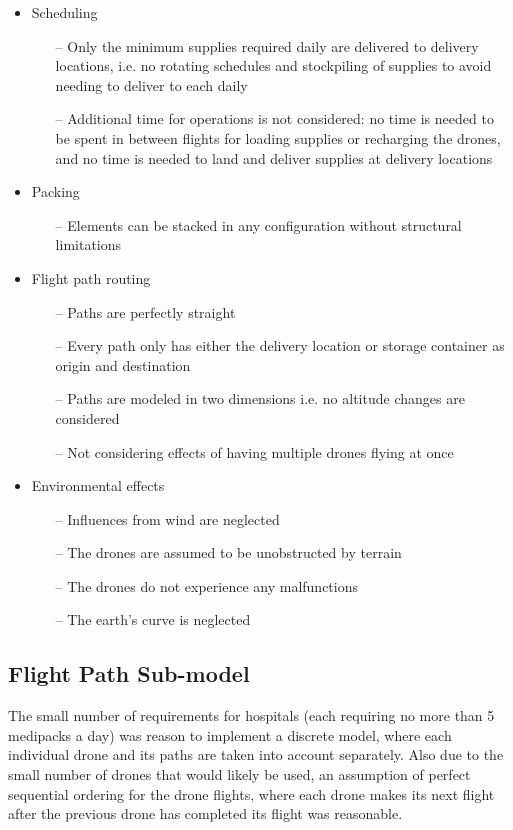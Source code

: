\documentclass[twocolumn,10pt]{asme2ej}
\begin{document}
\begin{itemize}
	\item Scheduling
	\begin{itemize}
		\item[--] Only the minimum supplies required daily are delivered to delivery locations, i.e. no rotating schedules and stockpiling of supplies to avoid needing to deliver to each daily
		\item[--] Additional time for operations is not considered: no time is needed to be spent in between flights for loading supplies or recharging the drones, and no time is needed to land and deliver supplies at delivery locations
	\end{itemize}
    \item Packing
    \begin{itemize}
    	\item[--] Elements can be stacked in any configuration without structural limitations
    \end{itemize}
	\item Flight path routing
	\begin{itemize}
		\item[--] Paths are perfectly straight
		\item[--] Every path only has either the delivery location or storage container as origin and destination
		\item[--] Paths are modeled in two dimensions i.e. no altitude changes are considered
		\item[--] Not considering effects of having multiple drones flying at once
	\end{itemize}
	\item Environmental effects
	\begin{itemize}
		\item[--] Influences from wind are neglected
		\item[--] The drones are assumed to be unobstructed by terrain
		\item[--] The drones do not experience any malfunctions
		\item[--] The earth’s curve is neglected
	\end{itemize}
\end{itemize}
 
 
\subsection{Flight Path Sub-model}
The small number of requirements for hospitals (each requiring no more than 5 medipacks a day) was reason to implement a discrete model, where each individual drone and its paths are taken into account separately. Also due to the small number of drones that would likely be used, an assumption of perfect sequential ordering for the drone flights, where each drone makes its next flight after the previous drone has completed its flight was reasonable. 
\end{document}
